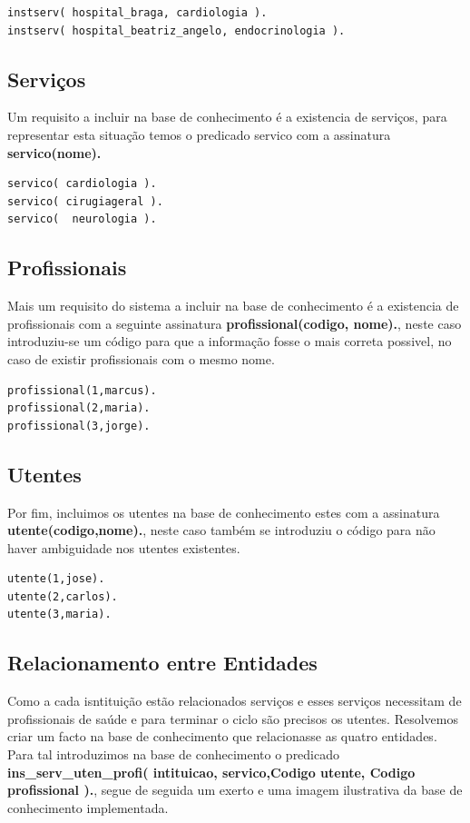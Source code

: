 \begin{verbatim}
instserv( hospital_braga, cardiologia ).
instserv( hospital_beatriz_angelo, endocrinologia ).
\end{verbatim}

\subsection{Serviços}
Um requisito a incluir na base de conhecimento é a existencia de serviços, para representar esta situação temos o predicado servico com a assinatura \textbf{servico(nome).}

\begin{Verbatim}
servico( cardiologia ). 
servico( cirugiageral ).
servico(  neurologia ).
\end{Verbatim}

\subsection{Profissionais}
Mais um requisito do sistema a incluir na base de conhecimento é a existencia de profissionais com a seguinte assinatura \textbf{profissional(codigo, nome).}, neste caso introduziu-se um código para que a informação fosse o mais correta possivel, no caso de existir profissionais com o mesmo nome. 

\begin{Verbatim}
profissional(1,marcus).
profissional(2,maria).
profissional(3,jorge).
\end{Verbatim}

\subsection{Utentes }
Por fim, incluimos os utentes na base de conhecimento estes com a assinatura \textbf{utente(codigo,nome).}, neste caso também se introduziu o código para não haver ambiguidade nos utentes existentes. 

\begin{Verbatim}
utente(1,jose).  
utente(2,carlos). 
utente(3,maria). 
\end{Verbatim}


\subsection{Relacionamento entre Entidades}
Como a cada isntituição estão relacionados serviços e esses serviços necessitam de profissionais de saúde e para terminar o ciclo são precisos os utentes. Resolvemos criar um facto na base de conhecimento que relacionasse as quatro entidades. Para tal introduzimos na base de conhecimento o predicado \textbf{ins\_serv\_uten\_profi( intituicao, servico,Codigo utente, Codigo profissional ).}, segue de seguida um exerto e uma imagem ilustrativa da base de conhecimento implementada. 

